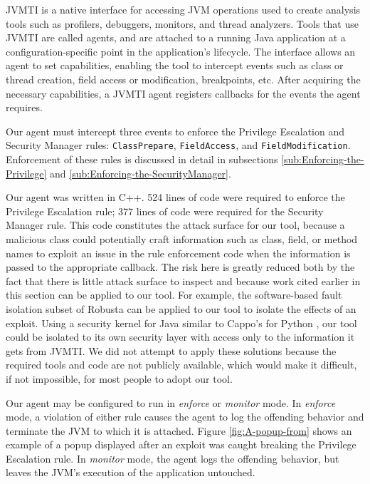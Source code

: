 \documentclass{sig-alternate}
\begin{document}
JVMTI is a native interface for accessing JVM operations used to create
analysis tools such as profilers, debuggers, monitors, and thread
analyzers. Tools that use JVMTI are called agents, and are attached
to a running Java application at a configuration-specific point in
the application's lifecycle. The interface allows an agent to set
capabilities, enabling the tool to intercept events such as class
or thread creation, field access or modification, breakpoints, etc.
After acquiring the necessary capabilities, a JVMTI agent registers
callbacks for the events the agent requires. 

Our agent must intercept three events to enforce the Privilege Escalation
and Security Manager rules: \texttt{ClassPrepare}, \texttt{FieldAccess},
and \texttt{FieldModification}. Enforcement of these rules is discussed
in detail in subsections \ref{sub:Enforcing-the-Privilege} and \ref{sub:Enforcing-the-SecurityManager}.

Our agent was written in C++. 524 lines of code were required to enforce
the Privilege Escalation rule; 377 lines of code were required for
the Security Manager rule. This code constitutes the attack surface
for our tool, because a malicious class could potentially craft information
such as class, field, or method names to exploit an issue in the rule
enforcement code when the information is passed to the appropriate
callback. The risk here is greatly reduced both by the fact that there
is little attack surface to inspect and because work cited earlier
in this section can be applied to our tool. For example, the software-based
fault isolation subset of Robusta \cite{siefers_robusta:_2010} can
be applied to our tool to isolate the effects of an exploit. Using
a security kernel for Java similar to Cappo's for Python \cite{cappos_retaining_2010},
our tool could be isolated to its own security layer with access only
to the information it gets from JVMTI. We did not attempt to apply
these solutions because the required tools and code are not publicly
available, which would make it difficult, if not impossible, for most
people to adopt our tool.

Our agent may be configured to run in \textit{enforce} or \textit{monitor}
mode. In \emph{enforce} mode, a violation of either rule causes the
agent to log the offending behavior and terminate the JVM to which
it is attached. Figure \ref{fig:A-popup-from} shows an example of
a popup displayed after an exploit was caught breaking the Privilege
Escalation rule. In \emph{monitor} mode, the agent logs the offending
behavior, but leaves the JVM's execution of the application untouched.
\end{document}
